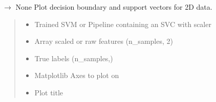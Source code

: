 \documentclass[letterpaper,10pt,english]{sphinxmanual}
\begin{document}

\begin{fulllineitems}
\label{\detokenize{Analysis:Analysis.plots.plot_decision_boundary}}
\pysigstartsignatures
\pysiglinewithargsret
{}
{\sphinxparamcomma {}\sphinxparamcomma {}\sphinxparamcomma {}\sphinxparamcomma {}}
{{ $\rightarrow$ None}}
\pysigstopsignatures
\sphinxAtStartPar
Plot decision boundary and support vectors for 2D data.
\begin{quote}\begin{description}
\begin{itemize}
\item {} 
\sphinxAtStartPar
{} \sphinxhyphen{}\sphinxhyphen{} Trained SVM or Pipeline containing an SVC with scaler

\item {} 
\sphinxAtStartPar
{} \sphinxhyphen{}\sphinxhyphen{} Array scaled or raw features (n\_samples, 2)

\item {} 
\sphinxAtStartPar
{} \sphinxhyphen{}\sphinxhyphen{} True labels (n\_samples,)

\item {} 
\sphinxAtStartPar
{} \sphinxhyphen{}\sphinxhyphen{} Matplotlib Axes to plot on

\item {} 
\sphinxAtStartPar
{} \sphinxhyphen{}\sphinxhyphen{} Plot title

\end{itemize}

\end{description}\end{quote}

\end{fulllineitems}
\end{document}
